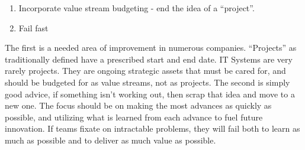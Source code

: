 \documentclass[man]{apa7}
\begin{document}
\begin{enumerate}
\item Incorporate value stream budgeting - end the idea of a ``project''.
\item Fail fast
\end{enumerate}

The first is a needed area of improvement in numerous companies. ``Projects'' as traditionally defined have a prescribed start and end date. IT Systems are very rarely projects. They are ongoing strategic assets that must be cared for, and should be budgeted for as value streams, not as projects. The second is simply good advice, if something isn't working out, then scrap that idea and move to a new one. The focus should be on making the most advances as quickly as possible, and utilizing what is learned from each advance to fuel future innovation. If teams fixate on intractable problems, they will fail both to learn as much as possible and to deliver as much value as possible. 




\printbibliography

\section{}
\label{sec:orgff89ee6}
\section{}
\label{sec:orgecb8417}
\end{document}
